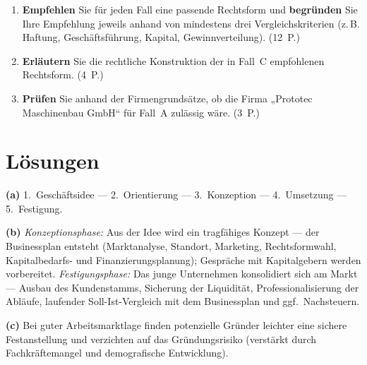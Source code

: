 \documentclass[11pt, a4paper]{article}
\begin{document}
\begin{enumerate}[label=(\alph*)]
  \item \textbf{Empfehlen} Sie für jeden Fall eine passende Rechtsform und
    \textbf{begründen} Sie Ihre Empfehlung jeweils anhand von mindestens drei
    Vergleichskriterien (z.\,B. Haftung, Geschäftsführung, Kapital, Gewinnverteilung).
    \hfill (12~P.)
  \item \textbf{Erläutern} Sie die rechtliche Konstruktion der in Fall~C empfohlenen
    Rechtsform. \hfill (4~P.)
  \item \textbf{Prüfen} Sie anhand der Firmengrundsätze, ob die Firma „Prototec
    Maschinenbau GmbH`` für Fall~A zulässig wäre. \hfill (3~P.)
\end{enumerate}

\newpage
\section{Lösungen}\label{loesungen}

\begin{loesung}[title={Lösung Aufgabe~1 --- Gründungsphasen}]
\textbf{(a)} 1.~Geschäftsidee --- 2.~Orientierung --- 3.~Konzeption --- 4.~Umsetzung ---
5.~Festigung.

\textbf{(b)} \emph{Konzeptionsphase:} Aus der Idee wird ein tragfähiges Konzept --- der
Businessplan entsteht (Marktanalyse, Standort, Marketing, Rechtsformwahl, Kapitalbedarfs-
und Finanzierungsplanung); Gespräche mit Kapitalgebern werden vorbereitet.
\emph{Festigungsphase:} Das junge Unternehmen konsolidiert sich am Markt --- Ausbau des
Kundenstamms, Sicherung der Liquidität, Professionalisierung der Abläufe, laufender
Soll-Ist-Vergleich mit dem Businessplan und ggf.\ Nachsteuern.

\textbf{(c)} Bei guter Arbeitsmarktlage finden potenzielle Gründer leichter eine sichere
Festanstellung und verzichten auf das Gründungsrisiko (verstärkt durch Fachkräftemangel
und demografische Entwicklung).
\end{loesung}
\end{document}

